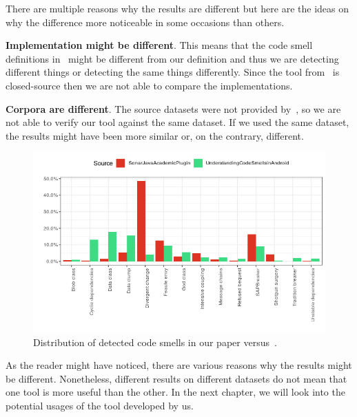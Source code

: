 There are multiple reasons why the results are different but here are the ideas on why the difference more noticeable in
some occasions than others.

\begin{flushleft}
    \textbf{Implementation might be different}.
    This means that the code smell definitions in~\cite{mannan2016understanding} might be different from our definition and thus we are detecting different things or detecting the same things differently.
    Since the tool from~\cite{mannan2016understanding} is closed-source then we are not able to compare the implementations.
\end{flushleft}

\begin{flushleft}
    \textbf{Corpora are different}.
    The source datasets were not provided by~\citeauthor{mannan2016understanding}, so we are not able to verify our tool against the same dataset.
    If we used the same dataset, the results might have been more similar or, on the contrary, different.
\end{flushleft}

\begin{figure} [htb]
    \includegraphics[scale=0.8]{figures/comparison_2.png}
    \caption{Distribution of detected code smells in our paper versus~\cite{mannan2016understanding}.}
    \label{fig:comparison_of_distributions}
\end{figure}

As the reader might have noticed, there are various reasons why the results might be different.
Nonetheless, different results on different datasets do not mean that one tool is more useful than the other.
In the next chapter, we will look into the potential usages of the tool developed by us.


